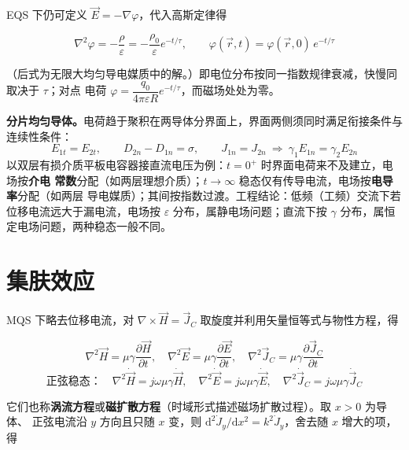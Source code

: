 EQS 下仍可定义 $\vec{E}=-\nabla\varphi$，代入高斯定律得

\begin{formulaBox}
\[
\nabla^{2}\varphi=-\frac{\rho}{\varepsilon}
=-\frac{\rho_0}{\varepsilon}e^{-t/\tau},
\qquad
\varphi(\vec{r},t)=\varphi(\vec{r},0)\,e^{-t/\tau}
\]
\end{formulaBox}
（后式为无限大均匀导电媒质中的解。）即电位分布按同一指数规律衰减，快慢同取决于 $\tau$；对点
电荷 $\varphi=\dfrac{q_0}{4\pi\varepsilon R}e^{-t/\tau}$，而磁场处处为零。

\textbf{分片均匀导体。}电荷趋于聚积在两导体分界面上，界面两侧须同时满足衔接条件与连续性条件：
\[
E_{1t}=E_{2t},
\qquad
D_{2n}-D_{1n}=\sigma,
\qquad
J_{1n}=J_{2n}\ \Longrightarrow\ \gamma_1E_{1n}=\gamma_2E_{2n}
\]
以双层有损介质平板电容器接直流电压为例：$t=0^+$ 时界面电荷来不及建立，电场按\textbf{介电
常数}分配（如两层理想介质）；$t\to\infty$ 稳态仅有传导电流，电场按\textbf{电导率}分配（如两层
导电媒质）；其间按指数过渡。工程结论：低频（工频）交流下若位移电流远大于漏电流，电场按
$\varepsilon$ 分布，属静电场问题；直流下按 $\gamma$ 分布，属恒定电场问题，两种稳态一般不同。


\section{集肤效应}

MQS 下略去位移电流，对 $\nabla\times\vec{H}=\vec{J}_C$ 取旋度并利用矢量恒等式与物性方程，得

\begin{formulaBox}
\[
\nabla^{2}\vec{H}=\mu\gamma\frac{\partial\vec{H}}{\partial t},
\quad
\nabla^{2}\vec{E}=\mu\gamma\frac{\partial\vec{E}}{\partial t},
\quad
\nabla^{2}\vec{J}_C=\mu\gamma\frac{\partial\vec{J}_C}{\partial t}
\]
\[
\text{正弦稳态：}\quad
\nabla^{2}\dot{\vec{H}}=j\omega\mu\gamma\dot{\vec{H}},
\quad
\nabla^{2}\dot{\vec{E}}=j\omega\mu\gamma\dot{\vec{E}},
\quad
\nabla^{2}\dot{\vec{J}}_C=j\omega\mu\gamma\dot{\vec{J}}_C
\]
\end{formulaBox}
它们也称\textbf{涡流方程}或\textbf{磁扩散方程}（时域形式描述磁场扩散过程）。取 $x>0$ 为导体、
正弦电流沿 $y$ 方向且只随 $x$ 变，则
$\mathrm{d}^{2}\dot{J}_y/\mathrm{d}x^{2}=k^{2}\dot{J}_y$，舍去随 $x$ 增大的项，得

